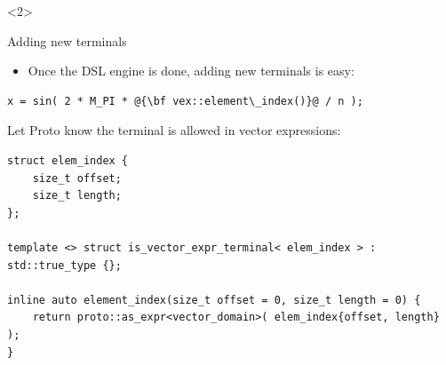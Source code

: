\documentclass[@BEAMER_OPTIONS@]{beamer}
\begin{document}
\begin{frame}[fragile]
\begin{onlyenv}
    \end{onlyenv}
    \begin{onlyenv}<2>
    \end{onlyenv}
\end{frame}

\begin{frame}[fragile]{Adding new terminals}
    \begin{itemize}
        \item Once the DSL engine is done, adding new terminals is easy:
    \end{itemize}
    \begin{exampleblock}{}
        \begin{lstlisting}[escapechar=@]
x = sin( 2 * M_PI * @{\bf vex::element\_index()}@ / n );
        \end{lstlisting}
    \end{exampleblock}
    \begin{exampleblock}{Let Proto know the terminal is allowed in vector
        expressions:}
        \begin{lstlisting}
struct elem_index {
    size_t offset;
    size_t length;
};

template <> struct is_vector_expr_terminal< elem_index > : std::true_type {};

inline auto element_index(size_t offset = 0, size_t length = 0) {
    return proto::as_expr<vector_domain>( elem_index{offset, length} );
}
        \end{lstlisting}
    \end{exampleblock}
\end{frame}
\end{document}
